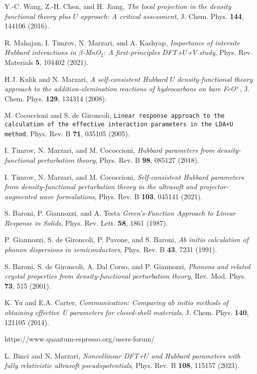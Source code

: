 \documentclass[12pt,a4paper]{article}
\begin{document}
\begin{thebibliography}{100}
   Y.-C. Wang, Z.-H. Chen, and H. Jiang, \textit{The local projection in the density functional theory plus $U$ approach: A critical assessment}, J. Chem. Phys. {\bf 144}, 144106 (2016).
  
   R. Mahajan, I. Timrov, N. Marzari, and A. Kashyap, \textit{Importance of intersite Hubbard interactions in $\beta$-MnO$_2$: A first-principles DFT+$U$+$V$ study}, Phys. Rev. Materials {\bf 5}, 104402 (2021).
  
   H.J. Kulik and N. Marzari, \textit{A self-consistent Hubbard $U$ density-functional theory approach to the addition-elemination reactions of hydrocarbons on bare FeO$^+$}, J. Chem. Phys. {\bf 129}, 134314 (2008).
  
   M. Cococcioni and S. de Gironcoli, \texttt{Linear response approach to the calculation of the effective interaction parameters in the LDA+U method}, Phys. Rev. B {\bf 71}, 035105 (2005).
  
   I. Timrov, N. Marzari, and M. Cococcioni, \textit{Hubbard parameters from density-functional perturbation theory}, Phys. Rev. B {\bf 98}, 085127 (2018).
  
   I. Timrov, N. Marzari, and M. Cococcioni, \textit{Self-consistent Hubbard parameters from density-functional perturbation theory in the ultrasoft and projector-augmented wave formulations}, Phys. Rev. B {\bf 103}, 045141 (2021).
  
   S. Baroni, P. Giannozzi, and A. Testa \textit{Green's-Function Approach to Linear Response in Solids}, Phys. Rev. Lett. {\bf 58}, 1861 (1987).
  
   P. Giannozzi, S. de Gironcoli, P. Pavone, and S. Baroni, \textit{Ab initio calculation of phonon dispersions in semiconductors}, Phys. Rev. B {\bf 43}, 7231 (1991).
  
   S. Baroni, S. de Gironcoli, A. Dal Corso, and P. Giannozzi, \textit{Phonons and related crystal properties from density-functional perturbation theory}, Rev. Mod. Phys. {\bf 73}, 515 (2001).
  
   K. Yu and E.A. Carter, \textit{Communication: Comparing ab initio methods of obtaining effective U parameters for closed-shell materials}, J. Chem. Phys. {\bf 140}, 121105 (2014).
  
   https://www.quantum-espresso.org/users-forum/

   L. Binci and N. Marzari, \textit{Noncollinear DFT+$U$ and Hubbard parameters with fully relativistic ultrasoft pseudopotentials}, Phys. Rev. B {\bf 108}, 115157 (2023).
  
\end{thebibliography}
\end{document}
